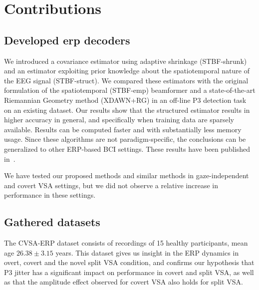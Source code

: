 
\section{Contributions}



\subsection{Developed \Ac{erp} decoders}
We introduced a covariance estimator using adaptive shrinkage (STBF-shrunk) and an estimator
exploiting prior knowledge about the spatiotemporal nature of the EEG signal
(STBF-struct).
We compared these estimators with the original formulation of the
spatiotemporal (STBF-emp)
beamformer and a state-of-the-art Riemannian Geometry method (XDAWN+RG) in an off-line P3 detection task on
an existing dataset.
Our results show that the structured estimator results in higher accuracy in
general, and specifically when training data are sparsely available.
Results can be computed faster and with
substantially less memory usage.
Since these algorithms are not paradigm-specific, the conclusions can be
generalized to other ERP-based BCI settings.
These results have been published in~\cite{VanDenKerchove2022}.

We have tested our proposed methods and similar methods in gaze-independent and
covert VSA settings, but we did not observe a relative increase in performance
in these settings.



\subsection{Gathered datasets}
The CVSA-ERP dataset consists of recordings of 15 healthy participants, mean age
$26.38\pm3.15$ years.
This dataset gives us insight in the ERP dynamics in overt, covert and the
novel split VSA condition, and confirms our hypothesis that P3 jitter has a
significant impact on performance in covert and split VSA, as well as that the
amplitude effect observed for covert VSA also holds for split VSA.

